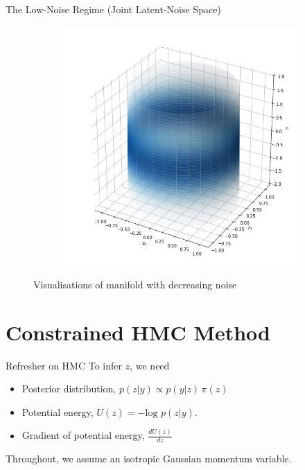 \documentclass[10pt]{beamer}
\begin{document}
\begin{frame}[fragile]{The Low-Noise Regime (Joint Latent-Noise Space)}
\begin{figure}
\begin{subfigure}[b]{0.32\textwidth}
        \end{subfigure}%
        \begin{subfigure}[b]{0.32\textwidth}
            \includegraphics[width=\textwidth]{m_low_noise.png}
        \end{subfigure}
        \caption{Visualisations of manifold with decreasing noise}
    \end{figure}
    
\end{frame}

\section{Constrained HMC Method}

\begin{frame}[fragile]{Refresher on HMC}
    To infer $z$, we need
    \begin{itemize}
        \item Posterior distribution, $p(z|y) \propto p(y|z) \,\pi(z)$ 
        \item Potential energy, $U(z) = -\text{log }p(z|y)$.
        \item Gradient of potential energy, $\frac{dU(z)}{dz}$
    \end{itemize}
    \vspace{10pt}
    Throughout, we assume an isotropic Gaussian momentum variable.
\end{frame}
\end{document}

